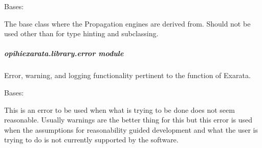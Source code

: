 \documentclass[letterpaper,11pt,english]{sphinxmanual}
\begin{document}
\begin{savenotes}\begin{fulllineitems}
\label{\detokenize{code/opihiexarata.library.engine:opihiexarata.library.engine.PropagationEngine}}
\pysigstartsignatures
{}
\pysigstopsignatures
\sphinxAtStartPar
Bases: {\hyperref[\detokenize{code/opihiexarata.library.engine:opihiexarata.library.engine.ExarataEngine}]{}}

\sphinxAtStartPar
The base class where the Propagation engines are derived from. Should
not be used other than for type hinting and subclassing.

\end{fulllineitems}\end{savenotes}


\sphinxstepscope


\subparagraph{opihiexarata.library.error module}
\label{\detokenize{code/opihiexarata.library.error:module-opihiexarata.library.error}}\label{\detokenize{code/opihiexarata.library.error:opihiexarata-library-error-module}}\label{\detokenize{code/opihiexarata.library.error::doc}}
\sphinxAtStartPar
Error, warning, and logging functionality pertinent to the function of Exarata.

\begin{savenotes}\begin{fulllineitems}
\label{\detokenize{code/opihiexarata.library.error:opihiexarata.library.error.BeyondScopeError}}
\pysigstartsignatures
{}
\pysigstopsignatures
\sphinxAtStartPar
Bases: {\hyperref[\detokenize{code/opihiexarata.library.error:opihiexarata.library.error.ExarataBaseException}]{}}

\sphinxAtStartPar
This is an error to be used when what is trying to be done does not
seem reasonable. Usually warnings are the better thing for this but
this error is used when the assumptions for reasonability guided
development and what the user is trying to do is not currently supported
by the software.

\end{fulllineitems}\end{savenotes}
\end{document}
